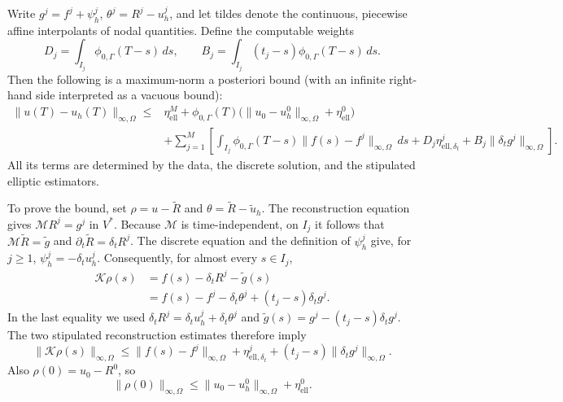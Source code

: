 \documentclass{article}
\begin{document}
Write \(g^j=f^j+\psi_h^j\), \(\theta^j=R^j-u_h^j\), and let tildes denote the continuous, piecewise affine interpolants of nodal quantities. Define the computable weights
\[
D_j=\int_{I_j}\phi_{0,\Gamma}(T-s)\,ds,\qquad
B_j=\int_{I_j}(t_j-s)\phi_{0,\Gamma}(T-s)\,ds.
\]
Then the following is a maximum-norm a posteriori bound (with an infinite right-hand side interpreted as a vacuous bound):
\[
\begin{aligned}
\|u(T)-u_h(T)\|_{\infty,\Omega}\leq{}&\eta_{\mathrm{ell}}^M
 +\phi_{0,\Gamma}(T)\bigl(\|u_0-u_h^0\|_{\infty,\Omega}+\eta_{\mathrm{ell}}^0\bigr)\\
&+\sum_{j=1}^M\left[\int_{I_j}\phi_{0,\Gamma}(T-s)
             \|f(s)-f^j\|_{\infty,\Omega}\,ds
       +D_j\eta_{\mathrm{ell},\delta_t}^j
       +B_j\|\delta_t g^j\|_{\infty,\Omega}\right].
\end{aligned}
\]
All its terms are determined by the data, the discrete solution, and the stipulated elliptic estimators.

To prove the bound, set \(\rho=u-\widetilde R\) and \(\theta=\widetilde R-\widetilde u_h\). The reconstruction equation gives \(\mathcal M R^j=g^j\) in \(V^*\). Because \(\mathcal M\) is time-independent, on \(I_j\) it follows that \(\mathcal M\widetilde R=\widetilde g\) and \(\partial_t\widetilde R=\delta_tR^j\). The discrete equation and the definition of \(\psi_h^j\) give, for \(j\geq1\), \(\psi_h^j=-\delta_tu_h^j\). Consequently, for almost every \(s\in I_j\),
\[
\begin{aligned}
\mathcal K\rho(s)
 &=f(s)-\delta_tR^j-\widetilde g(s)\\
 &=f(s)-f^j-\delta_t\theta^j
       +(t_j-s)\delta_t g^j.
\end{aligned}
\]
In the last equality we used \(\delta_tR^j=\delta_tu_h^j+\delta_t\theta^j\) and \(\widetilde g(s)=g^j-(t_j-s)\delta_tg^j\). The two stipulated reconstruction estimates therefore imply
\[
\|\mathcal K\rho(s)\|_{\infty,\Omega}
 \leq \|f(s)-f^j\|_{\infty,\Omega}
       +\eta_{\mathrm{ell},\delta_t}^j
       +(t_j-s)\|\delta_tg^j\|_{\infty,\Omega}.
\]
Also \(\rho(0)=u_0-R^0\), so
\[
\|\rho(0)\|_{\infty,\Omega}\leq
\|u_0-u_h^0\|_{\infty,\Omega}+\eta_{\mathrm{ell}}^0.
\]
\end{document}
